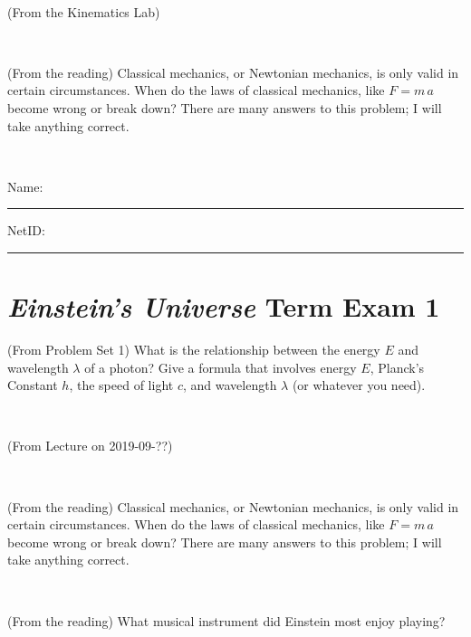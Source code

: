 \documentclass[12pt, letterpaper]{article}
\begin{document}
\vfill ~

\begin{problem} (From the Kinematics Lab)

\end{problem}


\vfill ~

\begin{problem} (From the reading)
Classical mechanics, or Newtonian mechanics, is only valid in certain
circumstances. When do the laws of classical mechanics, like $F =
m\,a$ become wrong or break down? There are many answers to this
problem; I will take anything correct.
\end{problem}


\vfill ~


\cleardoublepage



\noindent
Name: \rule[-1ex]{0.60\textwidth}{0.1pt}
NetID: \rule[-1ex]{0.20\textwidth}{0.1pt}

\section*{\textsl{Einstein's Universe} Term Exam 1}
\setcounter{problem}{1}


\begin{problem} (From Problem Set 1)
What is the relationship between the energy $E$ and wavelength
$\lambda$ of a photon? Give a formula that involves energy $E$,
Planck's Constant $h$, the speed of light $c$, and wavelength
$\lambda$ (or whatever you need).
\end{problem}

\vfill ~

\begin{problem} (From Lecture on 2019-09-??)
\end{problem}


\vfill ~

\begin{problem} (From the reading)
Classical mechanics, or Newtonian mechanics, is only valid in certain
circumstances. When do the laws of classical mechanics, like $F =
m\,a$ become wrong or break down? There are many answers to this
problem; I will take anything correct.
\end{problem}


\vfill ~

\begin{problem} (From the reading)
What musical instrument did Einstein most enjoy playing?
\end{problem}
\end{document}

